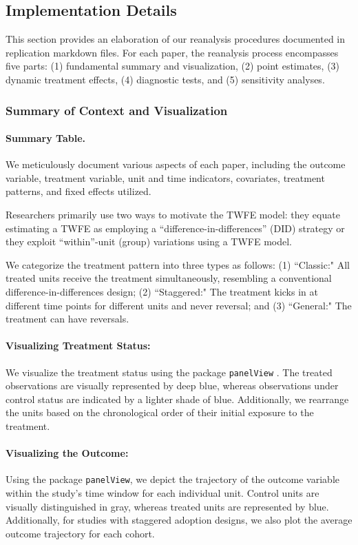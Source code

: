\documentclass[12pt]{article}
\begin{document}
\subsection{Implementation Details}

This section provides an elaboration of our reanalysis procedures documented in replication markdown files. For each paper, the reanalysis process encompasses five parts: (1) fundamental summary and visualization, (2) point estimates, (3) dynamic treatment effects, (4) diagnostic tests, and (5) sensitivity analyses.

\subsubsection{Summary of Context and Visualization}

\paragraph*{Summary Table.} We meticulously document various aspects of each paper, including the outcome variable, treatment variable, unit and time indicators, covariates, treatment patterns, and fixed effects utilized. 

Researchers primarily use two ways to motivate the TWFE model: they equate estimating a TWFE as employing a ``difference-in-differences'' (DID) strategy or they exploit ``within''-unit (group) variations using a TWFE model. 

We categorize the treatment pattern into three types as follows: (1) ``Classic:" All treated units receive the treatment simultaneously, resembling a conventional difference-in-differences design; (2) ``Staggered:" The treatment kicks in at different time points for different units and never reversal; and (3) ``General:" The treatment can have reversals.



\paragraph*{Visualizing Treatment Status:} We visualize the treatment status using the package \texttt{panelView} \citep{mou2023panelview}. The treated observations are visually represented by deep blue, whereas observations under control status are indicated by a lighter shade of blue. Additionally, we rearrange the units based on the chronological order of their initial exposure to the treatment.

\paragraph*{Visualizing the Outcome:} Using the package \texttt{panelView}, we depict the trajectory of the outcome variable within the study's time window for each individual unit. Control units are visually distinguished in gray, whereas treated units are represented by blue. Additionally, for studies with staggered adoption designs, we also plot the average outcome trajectory for each cohort. 
\end{document}
